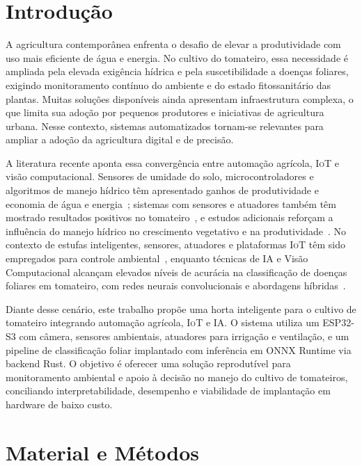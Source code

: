 \documentclass[12pt]{article}
\providecommand{\gls}[1]{\textnormal{\textsc{#1}}}
\begin{document}
\section{Introdução}

A agricultura contemporânea enfrenta o desafio de elevar a produtividade com
uso mais eficiente de água e energia. No cultivo do tomateiro, essa necessidade
é ampliada pela elevada exigência hídrica e pela suscetibilidade a doenças
foliares, exigindo monitoramento contínuo do ambiente e do estado
fitossanitário das plantas. Muitas soluções disponíveis ainda apresentam
infraestrutura complexa, o que limita sua adoção por pequenos produtores e
iniciativas de agricultura urbana. Nesse contexto, sistemas automatizados
tornam-se relevantes para ampliar a adoção da agricultura digital e de
precisão.

A literatura recente aponta essa convergência entre automação agrícola,
\gls{IoT} e visão computacional. Sensores de umidade do solo,
microcontroladores e algoritmos de manejo hídrico têm apresentado ganhos de
produtividade e economia de água e
energia~\cite[p.~106--109]{azevedo2025}; sistemas com sensores e atuadores
também têm mostrado resultados positivos no
tomateiro~\cite[p.~182--185]{ARAUJO2023}, e estudos adicionais reforçam a
influência do manejo hídrico no crescimento vegetativo e na
produtividade~\cite{campos2020,Silva2025}. No contexto de estufas inteligentes, sensores, atuadores e plataformas
\gls{IoT} têm sido empregados para controle ambiental~\cite{Borba2022,Leite2022,Costa2020,Ouhami2021},
enquanto técnicas de \gls{IA} e Visão Computacional alcançam elevados níveis
de acurácia na classificação de doenças foliares em tomateiro, com redes
neurais convolucionais e abordagens
híbridas~\cite{Paul2023,Kebir2024,Wang2024,Mac2024}.

Diante desse cenário, este trabalho propõe uma horta inteligente para o
cultivo de tomateiro integrando automação agrícola, \gls{IoT} e \gls{IA}. O
sistema utiliza um \gls{ESP32}-S3 com câmera, sensores ambientais, atuadores
para irrigação e ventilação, e um pipeline de classificação foliar implantado
com inferência em ONNX Runtime via backend Rust. O objetivo é oferecer uma
solução reprodutível para monitoramento ambiental e apoio à decisão no manejo
do cultivo de tomateiros, conciliando interpretabilidade, desempenho e
viabilidade de implantação em hardware de baixo custo.

\section{Material e Métodos}
\end{document}
